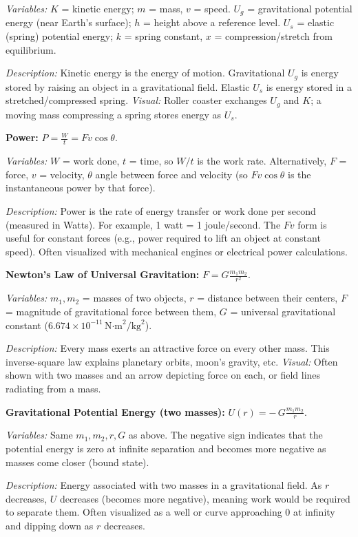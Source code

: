 \documentclass{article}
\begin{document}
\textit{Variables:} $K$ = kinetic energy; $m$ = mass, $v$ = speed. $U_g$ = gravitational potential energy (near Earth’s surface); $h$ = height above a reference level. $U_s$ = elastic (spring) potential energy; $k$ = spring constant, $x$ = compression/stretch from equilibrium.

\textit{Description:} Kinetic energy is the energy of motion. Gravitational $U_g$ is energy stored by raising an object in a gravitational field. Elastic $U_s$ is energy stored in a stretched/compressed spring. \textit{Visual:} Roller coaster exchanges $U_g$ and $K$; a moving mass compressing a spring stores energy as $U_s$.

\textbf{Power:} $P = \frac{W}{t} = F v \cos\theta$.

\textit{Variables:} $W$ = work done, $t$ = time, so $W/t$ is the work rate. Alternatively, $F$ = force, $v$ = velocity, $\theta$ angle between force and velocity (so $Fv\cos\theta$ is the instantaneous power by that force).

\textit{Description:} Power is the rate of energy transfer or work done per second (measured in Watts). For example, 1 watt = 1 joule/second. The $Fv$ form is useful for constant forces (e.g., power required to lift an object at constant speed). Often visualized with mechanical engines or electrical power calculations.

\textbf{Newton’s Law of Universal Gravitation:} $F = G \frac{m_1 m_2}{r^2}$.

\textit{Variables:} $m_1, m_2$ = masses of two objects, $r$ = distance between their centers, $F$ = magnitude of gravitational force between them, $G$ = universal gravitational constant ($6.674\times10^{-11}\,\text{N·m}^2/\text{kg}^2$).

\textit{Description:} Every mass exerts an attractive force on every other mass. This inverse-square law explains planetary orbits, moon’s gravity, etc. \textit{Visual:} Often shown with two masses and an arrow depicting force on each, or field lines radiating from a mass.

\textbf{Gravitational Potential Energy (two masses):} $U(r) = -\,G \frac{m_1 m_2}{r}$.

\textit{Variables:} Same $m_1, m_2, r, G$ as above. The negative sign indicates that the potential energy is zero at infinite separation and becomes more negative as masses come closer (bound state).

\textit{Description:} Energy associated with two masses in a gravitational field. As $r$ decreases, $U$ decreases (becomes more negative), meaning work would be required to separate them. Often visualized as a well or curve approaching 0 at infinity and dipping down as $r$ decreases.
\end{document}
